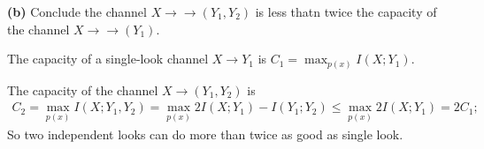 \documentclass[10pt]{article}
\begin{document}
\begin{tiny}
\begin{multicols}{3}
\textbf{(b)} Conclude the channel $X\rightarrow\rightarrow(Y_1,Y_2)$ is less thatn twice the capacity of the channel $X\rightarrow\rightarrow(Y_1)$.

The capacity of a single-look channel $X\rightarrow Y_1$ is $C_1 = \max_{p(x)} I(X;Y_1)$.

The capacity of the channel $X \rightarrow (Y_1,Y_2)$ is 
\begin{align*}
    C_2 = \max_{p(x)}I(X;Y_1,Y_2) 
    = \max_{p(x)} 2I(X;Y_1) -I(Y_1; Y_2) 
    \le \max_{p(x)}2I(X;Y_1) = 2C_1;
\end{align*}
So two independent looks can do more than twice as good as single look.



\end{multicols}
\end{tiny}
\end{document}
